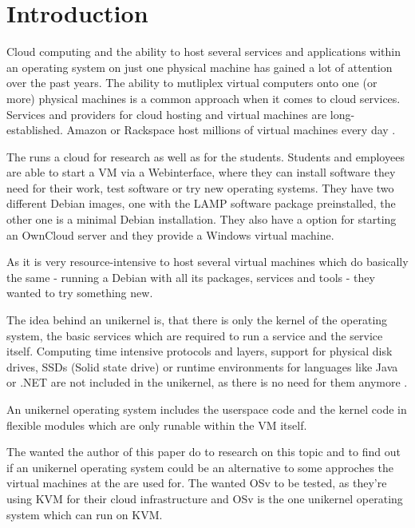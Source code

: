 \chapter{Introduction}

    Cloud computing and the ability to host several services and
    applications within an operating system on just one physical machine has
    gained a lot of attention over the past years. The ability to mutliplex
    virtual computers onto one (or more) physical machines is a common approach
    when it comes to cloud services. Services and providers for cloud hosting
    and virtual machines are long-established. Amazon or Rackspace host millions
    of virtual machines every day \cite[S. 1]{unikernels}.

    The \HFU{} runs a cloud for research as well as for the students. Students
    and employees are able to start a VM via a Webinterface, where they can
    install software they need for their work, test software or try new
    operating systems. They have two different Debian images, one with the LAMP
    software package preinstalled, the other one is a minimal Debian
    installation. They also
    have a option for starting an OwnCloud server and they provide a Windows
    virtual machine.

    As it is very resource-intensive to host several virtual machines which do
    basically the same - running a Debian with all its packages, services and
    tools - they wanted to try something new.

    The idea behind an unikernel is, that there is only the kernel of the
    operating system, the basic services which are required to run a service and
    the service itself. Computing time intensive protocols and layers, support
    for physical disk drives, SSDs (Solid state drive) or runtime environments
    for languages like Java or .NET are not included in the unikernel, as there
    is no need for them anymore \cite[S. 1]{unikernels}.

    An unikernel operating system includes the userspace code and the kernel
    code in flexible modules which are only runable within the VM itself.

    The \HFU{} wanted the author of this paper do to research on this topic and to
    find out if an unikernel operating system could be an alternative to some
    approches the virtual machines at the \HFU{} are used for. The \HFU{} wanted
    OSv to be tested, as they're using KVM for their cloud infrastructure and
    OSv is the one unikernel operating system which can run on KVM.

